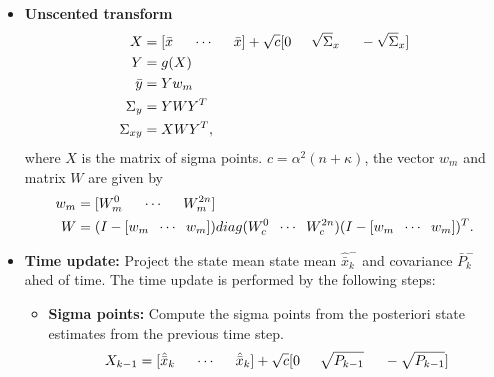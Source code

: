 \begin{itemize}
    \item \textbf{Unscented transform}
    \begin{equation}
        \begin{split}
            X &= [ \bar x \hspace{5mm} \cdots \hspace{5mm} \bar x ]+ \sqrt c [ 0 \hspace{5mm} \sqrt \Sigma_x \hspace{5mm} - \sqrt \Sigma_x ]\\
            Y &= g(X) \\
            \bar y &= Y w_m\\
            \Sigma_y &= Y W Y^T \\
            \Sigma_{xy} &= X W Y^T,
        \end{split}
    \end{equation}
    where $X$ is the matrix of sigma points. $c=\alpha^2(n+\kappa)$, the vector $w_m$ and matrix $W$ are given by
    \begin{equation}
        \begin{split}
        w_m &= [W_m^0 \hspace{5mm} \cdots \hspace{5mm} W_m^{2n} ]\\
        W &= (I-[w_m \hspace{2mm} \cdots \hspace{2mm} w_m])diag(W_c^0 \hspace{2mm} \cdots \hspace{2mm} W_c^{2n}) (I-[w_m \hspace{2mm} \cdots \hspace{2mm} w_m])^T.
        \end{split}
    \end{equation} 
    
    \item \textbf{Time update:} Project the state mean state mean $\hat{\bar x}^-_k$ and covariance ${\bar P}^-_k$ ahed of time. The time update is performed by the following steps:
    \begin{itemize}
        \item \textbf{Sigma points:} Compute the sigma points from the posteriori state estimates from the previous time step.
        \begin{equation}
        X_{k-1} = [ \hat{\bar{x}}_k \hspace{5mm} \cdots \hspace{5mm} \hat{\bar{x}}_k]+ \sqrt c [ 0 \hspace{5mm} \sqrt{P_{k-1}} \hspace{5mm} - \sqrt{P_{k-1}} ]
        \end{equation}


\end{itemize}
\end{itemize}

